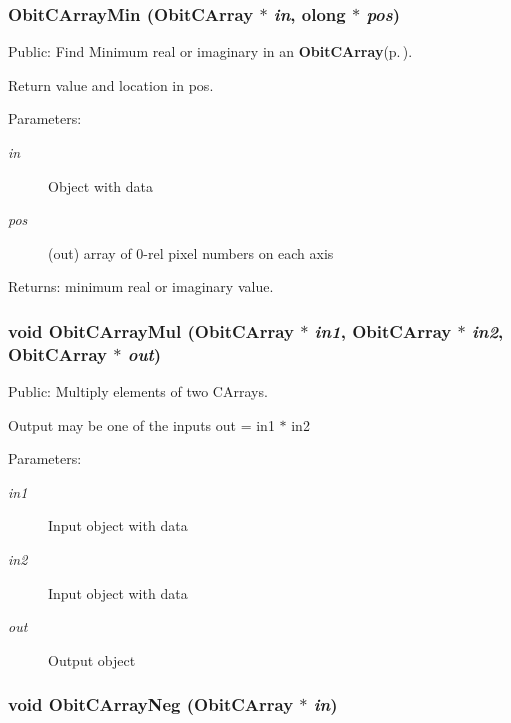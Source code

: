 \subsubsection{ Obit\-CArray\-Min ({\bf Obit\-CArray} $\ast$ {\em in}, {\bf olong} $\ast$ {\em pos})}\label{ObitCArray_8c_a14}


Public: Find Minimum real or imaginary in an {\bf Obit\-CArray}{\rm (p.\,\pageref{structObitCArray})}. 

Return value and location in pos. \begin{Desc}
\item[Parameters:]
\begin{description}
\item[{\em in}]Object with data \item[{\em pos}](out) array of 0-rel pixel numbers on each axis \end{description}
\end{Desc}
\begin{Desc}
\item[Returns:]minimum real or imaginary value. \end{Desc}
\subsubsection{\setlength{\rightskip}{0pt plus 5cm}void Obit\-CArray\-Mul ({\bf Obit\-CArray} $\ast$ {\em in1}, {\bf Obit\-CArray} $\ast$ {\em in2}, {\bf Obit\-CArray} $\ast$ {\em out})}\label{ObitCArray_8c_a24}


Public: Multiply elements of two CArrays. 

Output may be one of the inputs out = in1 $\ast$ in2 \begin{Desc}
\item[Parameters:]
\begin{description}
\item[{\em in1}]Input object with data \item[{\em in2}]Input object with data \item[{\em out}]Output object \end{description}
\end{Desc}
\subsubsection{\setlength{\rightskip}{0pt plus 5cm}void Obit\-CArray\-Neg ({\bf Obit\-CArray} $\ast$ {\em in})}\label{ObitCArray_8c_a15}


